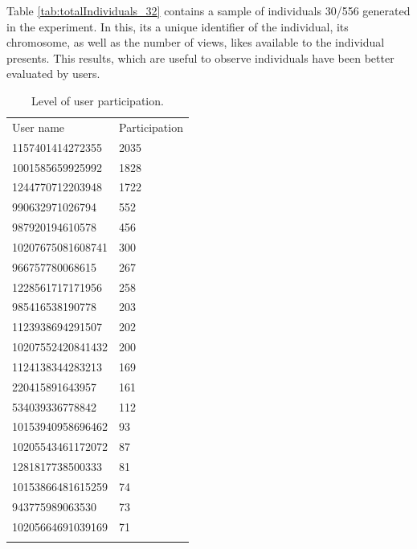 Table \ref{tab:totalIndividuals_32} contains a sample of individuals 30/556
generated in the experiment. In this, its a unique identifier of the individual,
its chromosome, as well as the number of views, likes available to the individual presents. 
This results, which are useful to observe individuals have been better evaluated by users.

\begin{table}
\small
\caption{Level of user participation.}
\label{tab:userParticipation_22}
\centering
\small
\begin{tabular}{p{4cm} p{4cm}}
\hline\noalign{\smallskip}
 User name & Participation   \\
\noalign{\smallskip}\hline\noalign{\smallskip}
\small{1157401414272355} & \small{2035} \\ \hline
\small{1001585659925992} & \small{1828} \\ \hline
\small{1244770712203948} & \small{1722} \\ \hline
\small{990632971026794} & \small{552} \\ \hline
\small{987920194610578} & \small{456} \\ \hline
\small{10207675081608741} & \small{300} \\ \hline
\small{966757780068615} & \small{267} \\ \hline
\small{1228561717171956} & \small{258} \\ \hline
\small{985416538190778} & \small{203} \\ \hline
\small{1123938694291507} & \small{202} \\ \hline
\small{10207552420841432} & \small{200} \\ \hline
\small{1124138344283213} & \small{169} \\ \hline
\small{220415891643957} & \small{161} \\ \hline
\small{534039336778842} & \small{112} \\ \hline
\small{10153940958696462} & \small{93} \\ \hline
\small{10205543461172072} & \small{87} \\ \hline
\small{1281817738500333} & \small{81} \\ \hline
\small{10153866481615259} & \small{74} \\ \hline
\small{943775989063530} & \small{73} \\ \hline
\small{10205664691039169} & \small{71} \\ \hline


\noalign{\smallskip}\hline
\end{tabular}
\end{table}

